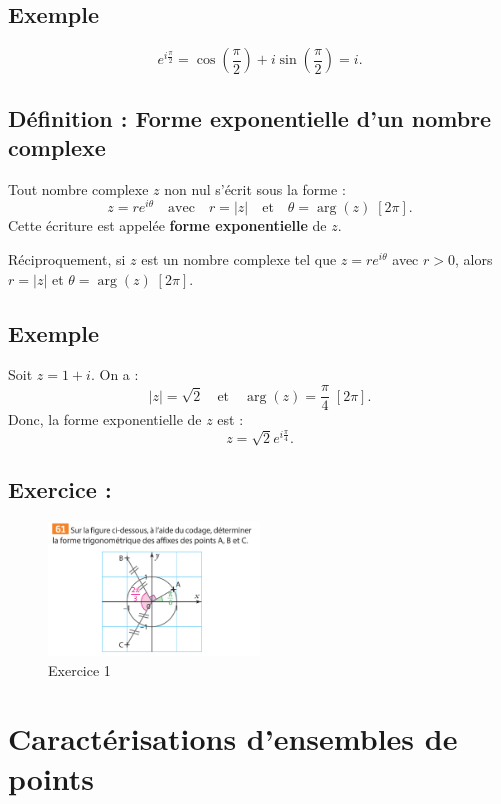 \documentclass[a4paper,12pt]{article}
\begin{document}
    \subsection{Exemple}

    \[
        e^{i\frac{\pi}{2}} = \cos\left(\frac{\pi}{2}\right) + i\sin\left(\frac{\pi}{2}\right) = i.
    \]

    \subsection{Définition : Forme exponentielle d’un nombre complexe}

    Tout nombre complexe $z$ non nul s’écrit sous la forme :
    \[
        z = r e^{i\theta} \quad \text{avec} \quad r = |z| \quad \text{et} \quad \theta = \arg(z) \; [2\pi].
    \]
    Cette écriture est appelée \textbf{forme exponentielle} de $z$.

    Réciproquement, si $z$ est un nombre complexe tel que $z = r e^{i\theta}$ avec $r > 0$, alors $r = |z|$ et $\theta = \arg(z) \; [2\pi]$.

    \subsection{Exemple}

    Soit $z = 1 + i$. On a :
    \[
        |z| = \sqrt{2} \quad \text{et} \quad \arg(z) = \frac{\pi}{4} \; [2\pi].
    \]
    Donc, la forme exponentielle de $z$ est :
    \[
        z = \sqrt{2} e^{i\frac{\pi}{4}}.
    \]
    \subsection{Exercice :}
    \begin{figure}[h]
        \centering
        \includegraphics[width=0.5\textwidth]{exo1.png}
        \caption{Exercice 1}
        \label{fig:exo1}
    \end{figure}

    \section*{Caractérisations d'ensembles de points}
\end{document}
